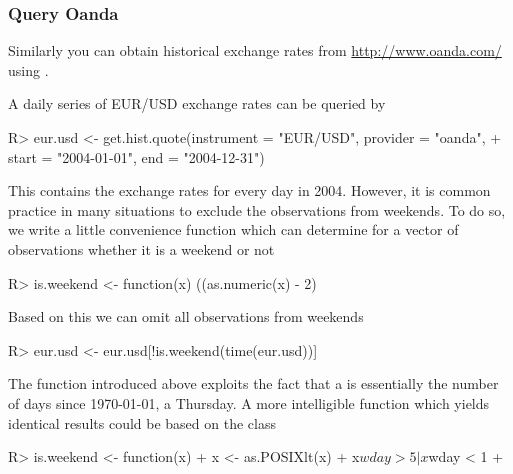 \documentclass[article,nojss]{jss}
\newcommand{\mysection}[1]{\subsubsection[#1]{\textbf{#1}}}
\begin{document}
\mysection{Query Oanda}

Similarly you can obtain historical exchange rates from \url{http://www.oanda.com/}
using .

A daily series of EUR/USD exchange rates can be queried by
\begin{Schunk}
\begin{Sinput}
R> eur.usd <- get.hist.quote(instrument = "EUR/USD", provider = "oanda", 
+     start = "2004-01-01", end = "2004-12-31")
\end{Sinput}
\end{Schunk}

This contains the exchange rates for every day in 2004. However, it is common practice
in many situations to exclude the observations from weekends. To do so, we
write a little convenience function which can determine for a vector of 
observations whether it is a weekend or not

\begin{Schunk}
\begin{Sinput}
R> is.weekend <- function(x) ((as.numeric(x) - 2)%%7) < 2
\end{Sinput}
\end{Schunk}

Based on this we can omit all observations from weekends
\begin{Schunk}
\begin{Sinput}
R> eur.usd <- eur.usd[!is.weekend(time(eur.usd))]
\end{Sinput}
\end{Schunk}

The function  introduced above exploits the fact that a 
is essentially the number of days since 1970-01-01, a Thursday. A more intelligible
function which yields identical results could be based on the  class

\begin{Schunk}
\begin{Sinput}
R> is.weekend <- function(x) {
+     x <- as.POSIXlt(x)
+     x$wday > 5 | x$wday < 1
+ }
\end{Sinput}
\end{Schunk}


\end{document}
